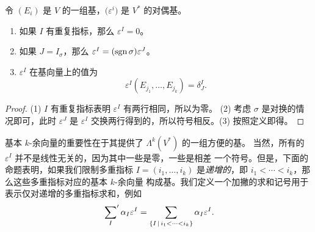 \begin{proposition}[基本 $k$-余向量的性质]
  令 $(E_i)$ 是 $V$ 的一组基，$\bigl(\varepsilon^i\bigr)$ 是 $V^*$ 的对偶基。
  \begin{enumerate}
    \item 如果 $I$ 有重复指标，那么 $\varepsilon^I=0$。
    \item 如果 $J=I_\sigma$，那么 $\varepsilon^I=(\operatorname{sgn}\sigma)\varepsilon^J$。
    \item $\varepsilon^I$ 在基向量上的值为
    \[
      \varepsilon^I(E_{j_1},\dots,E_{j_k})=\delta_J^I.  
    \]
  \end{enumerate}
\end{proposition}
\begin{proof}
  (1) $I$ 有重复指标表明 $\varepsilon^I$ 有两行相同，所以为零。
  (2) 考虑 $\sigma$ 是对换的情况即可，此时 $\varepsilon^J$ 是 $\varepsilon^I$
  交换两行得到的，所以符号相反。(3) 按照定义即得。
\end{proof}

基本 $k$-余向量的重要性在于其提供了 $\Lambda^k(V^*)$ 的一组方便的基。
当然，所有的 $\varepsilon^I$ 并不是线性无关的，因为其中一些是零，一些是相差
一个符号。但是，下面的命题表明，如果我们限制多重指标 $I=(i_1,\dots,i_k)$
是\emph{递增的}，即 $i_1<\cdots<i_k$，那么这些多重指标对应的基本 $k$-余向量
构成基。我们定义一个加撇的求和记号用于表示仅对递增的多重指标求和，例如
\[
  \sideset{}{'}\sum_{I}\alpha_I\varepsilon^I
  =\sum_{\{I\,|\, i_1<\cdots<i_k\}}  \alpha_I\varepsilon^I.
\]

